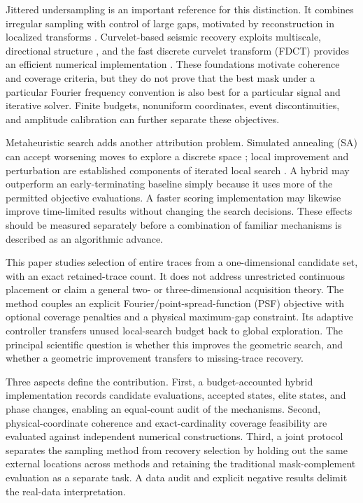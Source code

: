 \documentclass[journal]{IEEEtran}
\begin{document}
Jittered undersampling is an important reference for this distinction. It combines irregular sampling with control of large gaps, motivated by reconstruction in localized transforms \cite{jitter}. Curvelet-based seismic recovery exploits multiscale, directional structure \cite{crsi}, and the fast discrete curvelet transform (FDCT) provides an efficient numerical implementation \cite{fdct}. These foundations motivate coherence and coverage criteria, but they do not prove that the best mask under a particular Fourier frequency convention is also best for a particular signal and iterative solver. Finite budgets, nonuniform coordinates, event discontinuities, and amplitude calibration can further separate these objectives.

Metaheuristic search adds another attribution problem. Simulated annealing (SA) can accept worsening moves to explore a discrete space \cite{sa}; local improvement and perturbation are established components of iterated local search \cite{ils}. A hybrid may outperform an early-terminating baseline simply because it uses more of the permitted objective evaluations. A faster scoring implementation may likewise improve time-limited results without changing the search decisions. These effects should be measured separately before a combination of familiar mechanisms is described as an algorithmic advance.

This paper studies selection of entire traces from a one-dimensional candidate set, with an exact retained-trace count. It does not address unrestricted continuous placement or claim a general two- or three-dimensional acquisition theory. The method couples an explicit Fourier/point-spread-function (PSF) objective with optional coverage penalties and a physical maximum-gap constraint. Its adaptive controller transfers unused local-search budget back to global exploration. The principal scientific question is whether this improves the geometric search, and whether a geometric improvement transfers to missing-trace recovery.

Three aspects define the contribution. First, a budget-accounted hybrid implementation records candidate evaluations, accepted states, elite states, and phase changes, enabling an equal-count audit of the mechanisms. Second, physical-coordinate coherence and exact-cardinality coverage feasibility are evaluated against independent numerical constructions. Third, a joint protocol separates the sampling method from recovery selection by holding out the same external locations across methods and retaining the traditional mask-complement evaluation as a separate task. A data audit and explicit negative results delimit the real-data interpretation.
\end{document}
